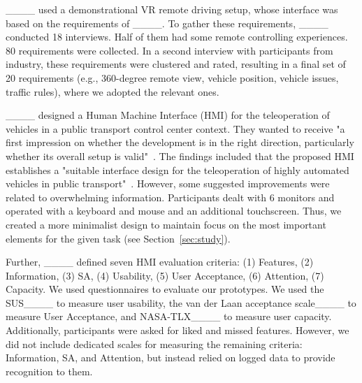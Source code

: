____ used a demonstrational VR remote driving setup, whose interface was based on the requirements of ____.
To gather these requirements, ____ conducted 18 interviews. Half of them had some remote controlling experiences. %
80 requirements were collected. In a second interview with participants from industry, these requirements were clustered and rated, resulting in a final set of 20 requirements (e.g., 360-degree remote view, vehicle position, vehicle issues, traffic rules), where we adopted the relevant ones. %

____ designed a Human Machine Interface (HMI) for the teleoperation of vehicles in a public transport control center context. %
They wanted to receive "a first impression on whether the development is in the right direction, particularly whether its overall setup is valid"~\cite[p. 19]{kettwich_teleoperation_2021}.
The findings included that the proposed HMI establishes a "suitable interface design for the teleoperation of highly automated vehicles in public transport"~\cite[p. 15]{kettwich_teleoperation_2021}. However, some suggested improvements were related to overwhelming information. Participants dealt with 6 monitors and operated with a keyboard and mouse and an additional touchscreen. Thus, we created a more minimalist design to maintain focus on the most important elements for the given task (see Section~\ref{sec:study}).

Further, ____ defined seven HMI evaluation criteria: (1) Features, (2) Information, (3) SA, (4) Usability, (5) User Acceptance, (6) Attention, (7) Capacity. We used questionnaires to evaluate our prototypes. We used the SUS____ to measure user usability, the van der Laan acceptance scale____ to measure User Acceptance, and NASA-TLX____ to measure user capacity. Additionally, participants were asked for liked and missed features. However, we did not include dedicated scales for measuring the remaining criteria: Information, SA, and Attention, but instead relied on logged data to provide recognition to them. %






